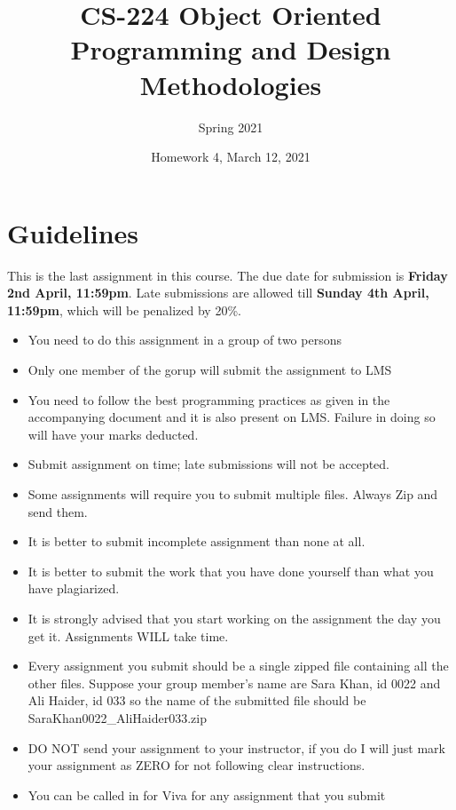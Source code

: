 \documentclass[a4paper,12pt]{article}
\begin{document}
	
	\title{CS-224 Object Oriented Programming and Design Methodologies }
	\author{Spring 2021}
	\date{Homework 4, March 12, 2021}
	\maketitle
	\section{Guidelines}
	This is the last assignment in this course. The due date for submission is \textbf{Friday 2nd April, 11:59pm}. Late submissions are allowed till \textbf{Sunday 4th April, 11:59pm}, which will be penalized by 20\%.
	
	\begin{itemize}
		\item You need to do this assignment in a group of two persons
		\item Only one member of the gorup will submit the assignment to LMS
		\item You need to follow the best programming practices as given in the accompanying document and it is also present on LMS. Failure in doing so will have your marks deducted.
		\item Submit assignment on time; late submissions will not be accepted.
		\item Some assignments will require you to submit multiple files. Always Zip and send them.
		\item It is better to submit incomplete assignment than none at all.
		\item It is better to submit the work that you have done yourself than what you have plagiarized.
		\item It is strongly advised that you start working on the assignment the day you get it. Assignments WILL take time.
		\item Every assignment you submit should be a single zipped file containing all the other files. Suppose your group member's name are Sara Khan, id 0022 and Ali Haider, id 033 so the name of the submitted file should be SaraKhan0022\_AliHaider033.zip
		\item DO NOT send your assignment to your instructor, if you do I will just mark your assignment as ZERO for not following clear instructions.
		\item You can be called in for Viva for any assignment that you submit
	\end{itemize}
	
	\newpage
	
\end{document}
